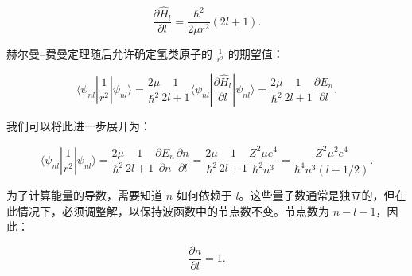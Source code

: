 \[
\frac{\partial \hat{H}_l}{\partial l} = \frac{\hbar^2}{2\mu r^2}(2l+1).
\]

赫尔曼–费曼定理随后允许确定氢类原子的 \(\frac{1}{r^2}\) 的期望值：

\[
\langle \psi_{nl} \left| \frac{1}{r^2} \right| \psi_{nl} \rangle = \frac{2\mu}{\hbar^2} \frac{1}{2l+1} \langle \psi_{nl} \left| \frac{\partial \hat{H}_l}{\partial l} \right| \psi_{nl} \rangle = \frac{2\mu}{\hbar^2} \frac{1}{2l+1} \frac{\partial E_n}{\partial l}.
\]

我们可以将此进一步展开为：

\[
\langle \psi_{nl} \left| \frac{1}{r^2} \right| \psi_{nl} \rangle = \frac{2\mu}{\hbar^2} \frac{1}{2l+1} \frac{\partial E_n}{\partial n} \frac{\partial n}{\partial l} = \frac{2\mu}{\hbar^2} \frac{1}{2l+1} \frac{Z^2 \mu e^4}{\hbar^2 n^3} = \frac{Z^2 \mu^2 e^4}{\hbar^4 n^3 (l + 1/2)}.
\]

为了计算能量的导数，需要知道 \(n\) 如何依赖于 \(l\)。这些量子数通常是独立的，但在此情况下，必须调整解，以保持波函数中的节点数不变。节点数为 \(n - l - 1\)，因此：

\[
\frac{\partial n}{\partial l} = 1.
\]